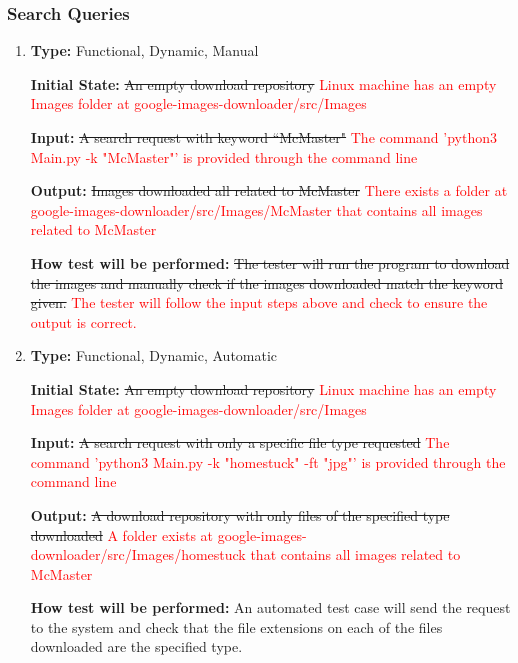 \documentclass[12pt, titlepage]{article}
\begin{document}
\subsubsection{Search Queries}

\begin{enumerate}[label=FR-SQ\arabic*:, wide=0pt, leftmargin=*]

\item \phantom{empty}

\textbf{Type:} Functional, Dynamic, Manual

\textbf{Initial State:} \sout{An empty download repository} 
\textcolor{red}{Linux machine has an empty Images folder at google-images-downloader/src/Images}

\textbf{Input:} \sout{A search request with keyword ``McMaster"} 
\textcolor{red}{The command 'python3 Main.py -k "McMaster"' is provided through the command line}

\textbf{Output:} \sout{Images downloaded all related to McMaster}
\textcolor{red}{There exists a folder at google-images-downloader/src/Images/McMaster that contains
all images related to McMaster}

\textbf{How test will be performed:} \sout{The tester will run the program to download the images and manually check if the images downloaded match the keyword given.}
\textcolor{red}{The tester will follow the input steps above and check to ensure the output is correct.}

\item \phantom{empty}

\textbf{Type:} Functional, Dynamic, Automatic
					
\textbf{Initial State:} \sout{An empty download repository}
\textcolor{red}{Linux machine has an empty Images folder at google-images-downloader/src/Images}
					
\textbf{Input:} \sout{A search request with only a specific file type requested}
\textcolor{red}{The command 'python3 Main.py -k "homestuck" -ft "jpg"' is provided through the command line}
					
\textbf{Output:} \sout{A download repository with only files of the specified type downloaded}
\textcolor{red}{A folder exists at google-images-downloader/src/Images/homestuck that contains
all images related to McMaster}
					
\textbf{How test will be performed:} An automated test case will send the request to the system and check that the file extensions on each of the files downloaded are the specified type.


\end{enumerate}
\end{document}
